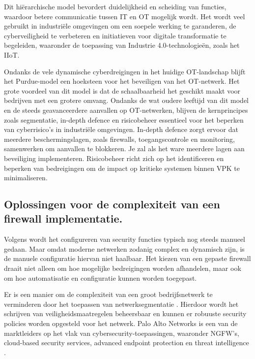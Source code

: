 Dit hiërarchische model bevordert duidelijkheid en scheiding van functies, waardoor betere communicatie tussen IT en OT mogelijk wordt. Het wordt veel gebruikt in industriële omgevingen om een soepele werking te garanderen, de cyberveiligheid te verbeteren en initiatieven voor digitale transformatie te begeleiden, waaronder de toepassing van Industrie 4.0-technologieën, zoals het IIoT. \autocite{Commers2025}

Ondanks de vele dynamische cyberdreigingen in het huidige OT-landschap blijft het Purdue-model een hoeksteen voor het beveiligen van het OT-netwerk. Het grote voordeel van dit model is dat de schaalbaarheid het geschikt maakt voor bedrijven met een grotere omvang. Ondanks de wat oudere leeftijd van dit model en de steeds geavanceerdere aanvallen op OT-netwerken, blijven de kernprincipes zoals segmentatie, in-depth defence en risicobeheer essentieel voor het beperken van cyberrisico’s in industriële omgevingen. In-depth defence zorgt ervoor dat meerdere beschermingslagen, zoals firewalls, toegangscontrole en monitoring, samenwerken om aanvallen te blokkeren. Je zal als het ware meerdere lagen aan beveiliging implementeren. Risicobeheer richt zich op het identificeren en beperken van bedreigingen om de impact op kritieke systemen binnen VPK te minimaliseren.

\subsection{Oplossingen voor de complexiteit van een firewall implementatie.}

Volgens \textcite{Bringhenti2023} wordt het configureren van security functies typisch nog steeds manueel gedaan. Maar omdat moderne netwerken zodanig complex en dynamisch zijn, is de manuele configuratie hiervan niet haalbaar. Het kiezen van een gepaste firewall draait niet alleen om hoe mogelijke bedreigingen worden afhandelen, maar ook om hoe automatisatie en configuratie kunnen worden toegepast.

Er is een manier om de complexiteit van een groot bedrijfsnetwerk te verminderen door het toepassen van netwerksegmentatie \autocite{Bringhenti2023}. Hierdoor wordt het schrijven van veiligheidsmaatregelen beheersbaar en kunnen er robuuste security policies worden opgesteld voor het netwerk. Palo Alto Networks is een van de marktleiders op het vlak van cybersecurity-toepassingen, waaronder NGFW’s, cloud-based security services, advanced endpoint protection en threat intelligence \autocite{TechnicalWhitepaper2014}.

